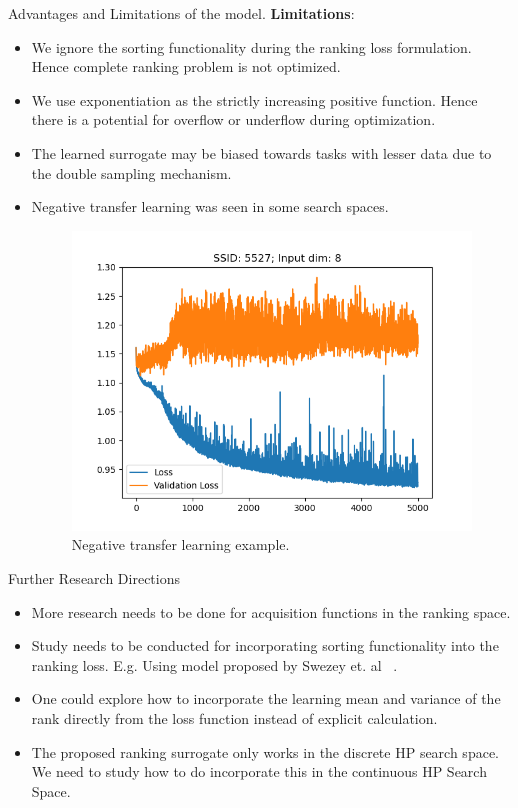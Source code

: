 \documentclass{beamer}
\begin{document}
\begin{frame}[t]{Advantages and Limitations of the model.}
\textbf{Limitations}:
\begin{itemize}
\item We ignore the sorting functionality during the ranking loss formulation. Hence complete ranking problem is not optimized.
\item We use exponentiation as the strictly increasing positive function. 
Hence there is a potential for overflow or underflow during optimization.
\item The learned surrogate may be biased towards tasks with lesser data due to the double sampling mechanism.
\item Negative transfer learning was seen in some search spaces.

\begin{figure}[htb]
  \centering
    \includegraphics[scale=0.25]{images/NegativeLearning}
    \caption{Negative transfer learning example.}
    \label{fig:NegativeLearning}
\end{figure}

\end{itemize}
\end{frame}

\begin{frame}[t]{Further Research Directions}
\begin{itemize}
\item More research needs to be done for acquisition functions in the ranking space.
\item Study needs to be conducted for incorporating sorting functionality into the ranking loss.  E.g.  Using model proposed by Swezey et. al ~\cite{PiRank}.
\item One could explore how to incorporate the learning mean and variance of the rank directly from the loss function instead of explicit calculation.
\item The proposed ranking surrogate only works in the discrete HP search space.  We need to study how to do incorporate this in the continuous HP Search Space.
\end{itemize}
\end{frame}
\end{document}
